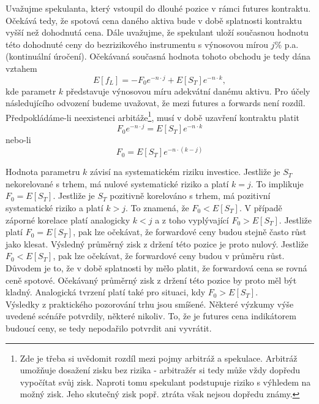 \documentclass[a4paper]{book}
\begin{document}
Uvažujme spekulanta, který vstoupil do dlouhé pozice v rámci futures kontraktu. Očekává tedy, že spotová cena daného aktiva bude v době splatnosti kontraktu vyšší než dohodnutá cena. Dále uvažujme, že spekulant uloží současnou hodnotu této dohodnuté ceny do bezrizikového instrumentu s výnosovou mírou $j$\% p.a. (kontinuální úročení). Očekávaná současná hodnota tohoto obchodu je tedy dána vztahem
\begin{equation*}
E[f_L] = -F_0e^{-n \cdot j} + E[S_T]e^{-n \cdot k},
\end{equation*}
kde parametr $k$ představuje výnosovou míru adekvátní danému aktivu. Pro účely následujícího odvození budeme uvažovat, že mezi futures a forwards není rozdíl. Předpokládáme-li neexistenci arbitáže\footnote{Zde je třeba si uvědomit rozdíl mezi pojmy arbitráž a spekulace. Arbitráž umožňuje dosažení zisku bez rizika - arbitražér si tedy může vždy dopředu vypočítat svůj zisk. Naproti tomu spekulant podstupuje riziko s výhledem na možný zisk. Jeho skutečný zisk popř. ztráta však nejsou dopředu známy.}, musí v době uzavření kontraktu platit
\begin{equation*}
F_0e^{-n \cdot j} = E[S_T]e^{-n \cdot k}
\end{equation*}
nebo-li
\begin{equation*}
F_0 = E[S_T]e^{-n \cdot (k-j)}
\end{equation*}

Hodnota parametru $k$ závisí na systematickém riziku investice. Jestliže je $S_T$ nekorelované s trhem, má nulové systematické riziko a platí $k = j$. To implikuje $F_0 = E[S_T]$. Jestliže je $S_T$ pozitivně korelováno s trhem, má pozitivní systematické riziko a platí $k > j$. To znamená, že $F_0 < E[S_T]$. V případě záporné korelace platí analogicky $k < j$ a z toho vyplývající $F_0 > E[S_T]$.
Jestliže platí $F_0 = E[S_T]$, pak lze očekávat, že forwardové ceny budou stejně často růst jako klesat. Výsledný průměrný zisk z držení této pozice je proto nulový. Jestliže $F_0 < E[S_T]$, pak lze očekávat, že forwardové ceny budou v průměru růst. Důvodem je to, že v době splatnosti by mělo platit, že forwardová cena se rovná ceně spotové. Očekávaný průměrný zisk z držení této pozice by proto měl být kladný.
Analogická tvrzení platí také pro situaci, kdy $F_0 > E[S_T]$.\\

Výsledky z praktického pozorování trhu jsou smíšené. Některé výzkumy výše uvedené scénáře potvrdily, některé nikoliv. To, že je futures cena indikátorem budoucí ceny, se tedy nepodařilo potvrdit ani vyvrátit.
\end{document}
